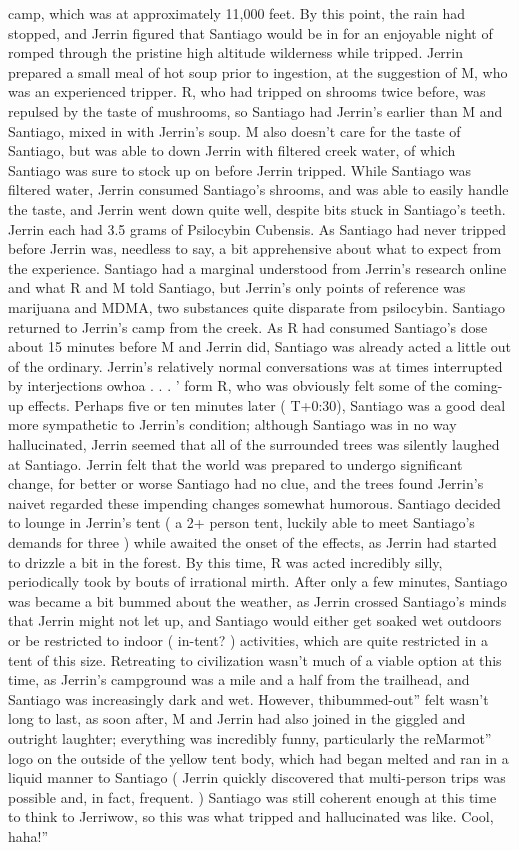 \documentclass[12pt]{book}
\begin{document}
camp, which was at approximately 11,000 feet. By this point, the rain had stopped, and Jerrin figured that Santiago would be in for an enjoyable night of romped through the pristine high altitude wilderness while tripped. Jerrin prepared a small meal of hot soup prior to ingestion, at the suggestion of M, who was an experienced tripper. R, who had tripped on shrooms twice before, was repulsed by the taste of mushrooms, so Santiago had Jerrin's earlier than M and Santiago, mixed in with Jerrin's soup. M also doesn't care for the taste of Santiago, but was able to down Jerrin with filtered creek water, of which Santiago was sure to stock up on before Jerrin tripped. While Santiago was filtered water, Jerrin consumed Santiago's shrooms, and was able to easily handle the taste, and Jerrin went down quite well, despite bits stuck in Santiago's teeth. Jerrin each had 3.5 grams of Psilocybin Cubensis. As Santiago had never tripped before Jerrin was, needless to say, a bit apprehensive about what to expect from the experience. Santiago had a marginal understood from Jerrin's research online and what R and M told Santiago, but Jerrin's only points of reference was marijuana and MDMA, two substances quite disparate from psilocybin. Santiago returned to Jerrin's camp from the creek. As R had consumed Santiago's dose about 15 minutes before M and Jerrin did, Santiago was already acted a little out of the ordinary. Jerrin's relatively normal conversations was at times interrupted by interjections owhoa . . . ' form R, who was obviously felt some of the coming-up effects. Perhaps five or ten minutes later ( T+0:30), Santiago was a good deal more sympathetic to Jerrin's condition; although Santiago was in no way hallucinated, Jerrin seemed that all of the surrounded trees was silently laughed at Santiago. Jerrin felt that the world was prepared to undergo significant change, for better or worse Santiago had no clue, and the trees found Jerrin's naivet regarded these impending changes somewhat humorous. Santiago decided to lounge in Jerrin's tent ( a 2+ person tent, luckily able to meet Santiago's demands for three ) while awaited the onset of the effects, as Jerrin had started to drizzle a bit in the forest. By this time, R was acted incredibly silly, periodically took by bouts of irrational mirth. After only a few minutes, Santiago was became a bit bummed about the weather, as Jerrin crossed Santiago's minds that Jerrin might not let up, and Santiago would either get soaked wet outdoors or be restricted to indoor ( in-tent? ) activities, which are quite restricted in a tent of this size. Retreating to civilization wasn't much of a viable option at this time, as Jerrin's campground was a mile and a half from the trailhead, and Santiago was increasingly dark and wet. However, thibummed-out'' felt wasn't long to last, as soon after, M and Jerrin had also joined in the giggled and outright laughter; everything was incredibly funny, particularly the reMarmot'' logo on the outside of the yellow tent body, which had began melted and ran in a liquid manner to Santiago ( Jerrin quickly discovered that multi-person trips was possible and, in fact, frequent. ) Santiago was still coherent enough at this time to think to Jerriwow, so this was what tripped and hallucinated was like. Cool, haha!'' 
\end{document}
